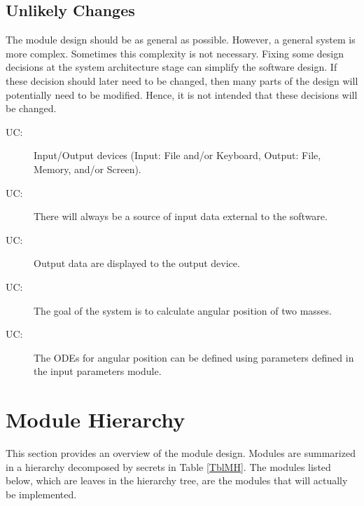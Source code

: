 \documentclass[12pt, titlepage]{article}
\newcounter{ucnum}
\newcommand{\uctheucnum}{UC\theucnum}
\begin{document}
\subsection{Unlikely Changes} \label{SecUchange}

The module design should be as general as possible. However, a general system is
more complex. Sometimes this complexity is not necessary. Fixing some design
decisions at the system architecture stage can simplify the software design. If
these decision should later need to be changed, then many parts of the design
will potentially need to be modified. Hence, it is not intended that these
decisions will be changed.

\begin{description}
\item[ \uctheucnum \label{ucIO}:] Input/Output devices
  (Input: File and/or Keyboard, Output: File, Memory, and/or Screen).
\item[ \uctheucnum \label{ucInput}:] There will always be
  a source of input data external to the software.
\item[ \uctheucnum \label{ucOutput}:] Output data are
  displayed to the output device.
\item[ \uctheucnum \label{ucGoal}:] The goal of the system
  is to calculate angular position of two masses.
\item[ \uctheucnum \label{ucODE}:] The ODEs for angular
  position can be defined using parameters defined in the input parameters
  module.
\end{description}

\section{Module Hierarchy} \label{SecMH}

This section provides an overview of the module design. Modules are summarized
in a hierarchy decomposed by secrets in Table \ref{TblMH}. The modules listed
below, which are leaves in the hierarchy tree, are the modules that will
actually be implemented.
\end{document}
